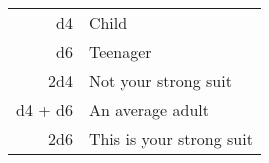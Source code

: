 \begin{tabular}{rl}
d4 & Child \\
d6 & Teenager \\
2d4 & Not your strong suit \\
d4 + d6 & An average adult \\
2d6 & This is your strong suit \\
\end{tabular}